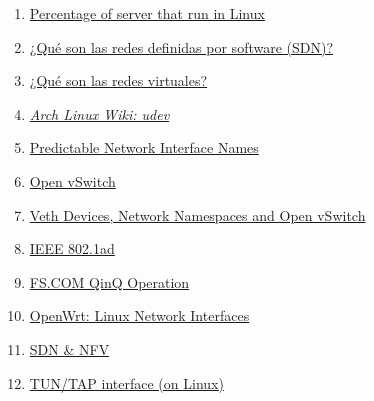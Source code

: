 \documentclass[12pt]{article}
\begin{document}
\begin{enumerate}
		\item
		\label{servers running linux}
		\href{https://hostingtribunal.com/blog/linux-statistics/}{Percentage of server that run in Linux}
		
		\item
		\label{bib: vmware sdn}
		\href{https://www.vmware.com/es/topics/glossary/content/software-defined-networking.html}{¿Qué son las redes definidas por software (SDN)?}
		
		\item
		\label{bib: vmware nfv}
		\href{https://www.vmware.com/es/topics/glossary/content/virtual-networking.html}{¿Qué son las redes virtuales?}
		
		\item
		\label{bib: udev archwiki}
		\href{https://wiki.archlinux.org/title/Udev}{\textit{Arch Linux Wiki: udev}}
		
		\item
		\label{bib: systemd networkd v197}
		\href{https://www.freedesktop.org/wiki/Software/systemd/PredictableNetworkInterfaceNames/}{Predictable Network Interface Names}
		
		\item
		\label{bib: open vswitch}
		\href{https://www.openvswitch.org/}{Open vSwitch}
		
		\item
		\label{bib: veth netns ovs}
		\href{https://matthewarcus.wordpress.com/2018/02/04/veth-devices-network-namespaces-and-open-vswitch/}{Veth Devices, Network Namespaces and Open vSwitch}
		
		\item
		\label{bib: 802.1ad}
		\href{http://www.microhowto.info/tags/802.1ad.html}{IEEE 802.1ad}
		
		\item
		\label{bib: FS QinQ}
		\href{https://img-en.fs.com/file/user_manual/s3800-series-qinq-operation.pdf}{FS.COM QinQ Operation}
		
		\item
		\label{bib: openwrt virtual network interfaces}
		\href{https://openwrt.org/docs/guide-developer/networking/network.interfaces}{OpenWrt: Linux Network Interfaces}
		
		\item
		\label{bib: sdn y nfv}
		\href{https://comparacloud.com/servicios-clouds/sdn-y-nfv/}{SDN \& NFV}
		
		\item
		\label{bib: tun vs tap}
		\href{https://www.gabriel.urdhr.fr/2021/05/08/tuntap/}{TUN/TAP interface (on Linux)}
		

\end{enumerate}
\end{document}
